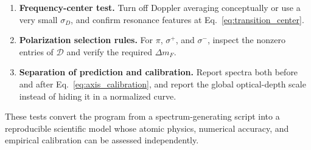 \begin{enumerate}[label=\arabic*.]
\item \textbf{Frequency-center test.}
Turn off Doppler averaging conceptually or use a very small \(\sigma_D\), and
confirm resonance features at Eq.~\eqref{eq:transition_center}.

\item \textbf{Polarization selection rules.}
For \(\pi\), \(\sigma^+\), and \(\sigma^-\), inspect the nonzero entries of
\(\mathcal D\) and verify the required \(\Delta m_F\).

\item \textbf{Separation of prediction and calibration.}
Report spectra both before and after
Eq.~\eqref{eq:axis_calibration}, and report the global optical-depth scale
instead of hiding it in a normalized curve.
\end{enumerate}

These tests convert the program from a spectrum-generating script into a
reproducible scientific model whose atomic physics, numerical accuracy, and
empirical calibration can be assessed independently.
